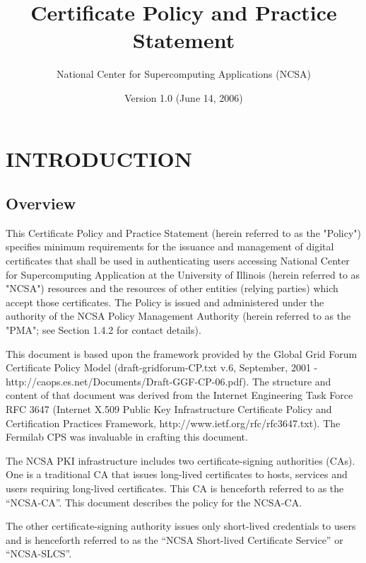 \documentclass[10pt]{article}
\begin{document}
\title{Certificate Policy and Practice Statement}
\author{National Center for Supercomputing Applications (NCSA)}

\date{Version 1.0 (June 14, 2006)}

\maketitle

\section{INTRODUCTION}

\subsection{Overview}

This Certificate Policy and Practice Statement (herein referred to as
the "Policy") specifies minimum requirements for the issuance and
management of digital certificates that shall be used in
authenticating users accessing National Center for Supercomputing
Application at the University of Illinois (herein referred to as
"NCSA") resources and the resources of other entities (relying
parties) which accept those certificates. The Policy is issued and
administered under the authority of the NCSA Policy Management
Authority (herein referred to as the "PMA"; see Section 1.4.2 for
contact details).

This document is based upon the framework provided by the Global Grid
Forum Certificate Policy Model (draft-gridforum-CP.txt v.6, September,
2001 - http://caops.es.net/Documents/Draft-GGF-CP-06.pdf).  The
structure and content of that document was derived from the Internet
Engineering Task Force RFC 3647 (Internet X.509 Public Key
Infrastructure Certificate Policy and Certification Practices
Framework, http://www.ietf.org/rfc/rfc3647.txt). The Fermilab CPS was
invaluable in crafting this document.

The NCSA PKI infrastructure includes two certificate-signing
authorities (CAs). One is a traditional CA that issues long-lived
certificates to hosts, services and users requiring long-lived
certificates. This CA is henceforth referred to as the “NCSA-CA”. This
document describes the policy for the NCSA-CA.

The other certificate-signing authority issues only short-lived
credentials to users and is henceforth referred to as the “NCSA
Short-lived Certificate Service” or “NCSA-SLCS”.
\end{document}
